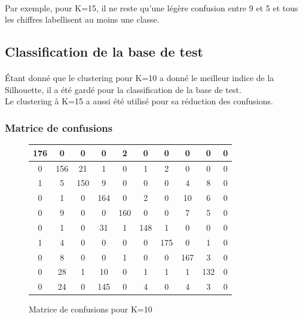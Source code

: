 \documentclass{article}
\begin{document}
\paragraph{}Par exemple, pour K=15, il ne reste qu'une légère confusion entre 9 et 5 et tous les chiffres labellisent au moins une classe.
\subsection{Classification de la base de test}
\paragraph{}Étant donné que le clustering pour K=10 a donné le meilleur indice de la Silhouette, il a été gardé pour la classification de la base de test.\\
Le clustering à K=15 a aussi été utilisé pour sa réduction des confusions.
\subsubsection{Matrice de confusions}
\begin{figure}[H]
    \centering
    \begin{tabular}{|c|c|c|c|c|c|c|c|c|c|}
        \hline
        176 & 0 & 0 & 0 & 2 & 0 & 0 & 0 & 0 & 0 \\
        \hline
        0 & 156 & 21 & 1 & 0 & 1 & 2 & 0 & 0 & 0\\
        \hline
        1 & 5 & 150 & 9 & 0 & 0 & 0 & 4 & 8 & 0\\
        \hline
        0 & 1 & 0 & 164 & 0 & 2 & 0 & 10 & 6 & 0\\
        \hline
        0 & 9 & 0 & 0 & 160 & 0 & 0 & 7 & 5 & 0\\
        \hline
        0 & 1 & 0 & 31 & 1 & 148 & 1 & 0 & 0 & 0\\
        \hline
        1 & 4 & 0 & 0 & 0 & 0 & 175 & 0 & 1 & 0 \\
        \hline
        0 & 8 & 0 & 0 & 1 & 0 & 0 & 167 & 3 & 0 \\
        \hline
        0 & 28 & 1 & 10 & 0 & 1 & 1 & 1 & 132 & 0 \\
        \hline
        0 & 24 & 0 & 145 & 0 & 4 & 0 & 4 & 3 & 0 \\
        \hline
    \end{tabular}
    \caption{Matrice de confusions pour K=10}    
\end{figure}
\end{document}
